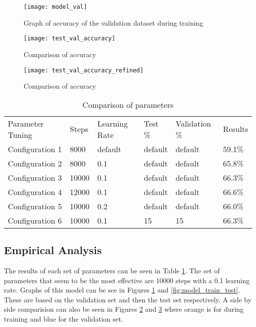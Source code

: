 \begin{figure}
    \texttt{[image: model\_val]}
     \caption{Graph of accuracy of the validation dataset during training}
     \label{fig:model_train_val}
\end{figure}

\begin{figure}
    \texttt{[image: test\_val\_accuracy]}
     \caption{Comparison of accuracy}
     \label{fig:test_val_accuracy}
\end{figure}

\begin{figure}
    \texttt{[image: test\_val\_accuracy\_refined]}
     \caption{Comparison of accuracy}
     \label{fig:test_val_accuracy_refined}
\end{figure}


\begin{table}[]
	\centering
	\caption{Comparison of parameters}
	\label{parameter_tuning_table}
	\begin{tabular}{llllll}
		Parameter Tuning & Steps & Learning Rate & Test \% & Validation \% &
		Results \\
		Configuration 1  & 8000  & default       & default & default       &
		59.1\%  \\
		Configuration 2  & 8000  & 0.1           & default & default       &
		65.8\%  \\
		Configuration 3  & 10000 & 0.1           & default & default       &
		66.3\%  \\
		Configuration 4  & 12000 & 0.1           & default & default       &
		66.6\%  \\
		Configuration 5  & 10000 & 0.2           & default & default       &
		66.0\%  \\
		Configuration 6  & 10000 & 0.1           & 15      & 15            &
		66.3\% 
	\end{tabular}
\end{table}

\subsection*{Empirical Analysis}
The results of each set of parameters can be seen in Table
\ref{parameter_tuning_table}. The set of parameters that seem to be the most
effective are 10000 steps with a 0.1 learning rate. Graphs of this model can be
see in Figures \ref{fig:model_train_val} and \ref{fig:model_train_test}. These
are based on the validation set and then the test set respectively. A side by
side comparision can also be seen in Figures \ref{fig:test_val_accuracy} and
\ref{fig:test_val_accuracy_refined} where orange is for during training and blue
for the validation set.
